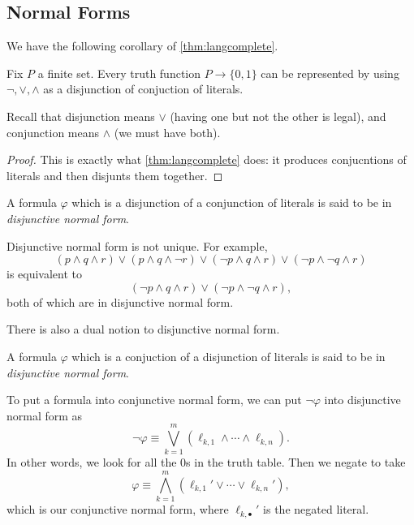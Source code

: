 \subsection{Normal Forms}
We have the following corollary of \autoref{thm:langcomplete}.
\begin{corollary} \label{cor:dnf}
	Fix $P$ a finite set. Every truth function $P\to\{0,1\}$ can be represented by using $\lnot,\lor,\land$ as a disjunction of conjuction of literals.
\end{corollary}
Recall that disjunction means $\lor$ (having one but not the other is legal), and conjunction means $\land$ (we must have both).
\begin{proof}
	This is exactly what \autoref{thm:langcomplete} does: it produces conjucntions of literals and then disjunts them together.
\end{proof}
\begin{definition}
	A formula $\varphi$ which is a disjunction of a conjunction of literals is said to be in \textit{disjunctive normal form}.
\end{definition}
\begin{example}
	Disjunctive normal form is not unique. For example,
	\[(p\land q\land r)\lor(p\land q\land\lnot r)\lor(\lnot p\land q\land r)\lor(\lnot p\land\lnot q\land r)\]
	is equivalent to
	\[(\lnot p\land q\land r)\lor(\lnot p\land\lnot q\land r),\]
	both of which are in disjunctive normal form.
\end{example}
There is also a dual notion to disjunctive normal form.
\begin{definition}
	A formula $\varphi$ which is a conjuction of a disjunction of literals is said to be in \textit{disjunctive normal form}.
\end{definition}
To put a formula into conjunctive normal form, we can put $\lnot\varphi$ into disjunctive normal form as
\[\lnot\varphi\equiv\bigvee_{k=1}^m(\ell_{k,1}\land\cdots\land\ell_{k,n}).\]
In other words, we look for all the $0$s in the truth table. Then we negate to take
\[\varphi\equiv\bigwedge_{k=1}^m(\ell_{k,1}'\lor\cdots\lor\ell_{k,n}'),\]
which is our conjunctive normal form, where $\ell_{k,\bullet}'$ is the negated literal.
